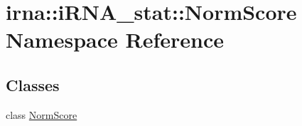 \hypertarget{namespaceirna_1_1iRNA__stat_1_1NormScore}{
\section{irna\-:\-:i\-R\-N\-A\-\_\-stat\-:\-:\-Norm\-Score \-Namespace \-Reference}
\label{namespaceirna_1_1iRNA__stat_1_1NormScore}
}
\subsection*{\-Classes}
\begin{DoxyCompactItemize}
\item 
class \hyperlink{classirna_1_1iRNA__stat_1_1NormScore_1_1NormScore}{\-Norm\-Score}
\end{DoxyCompactItemize}

